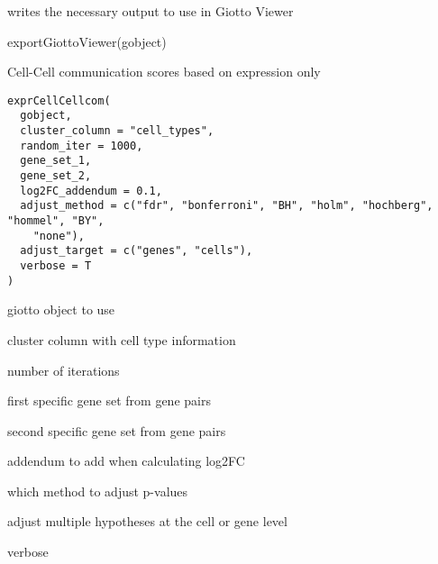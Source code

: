 \documentclass[a4paper]{book}
\begin{document}
%
\begin{Value}
writes the necessary output to use in Giotto Viewer
\end{Value}
%
\begin{Examples}
\begin{ExampleCode}
    exportGiottoViewer(gobject)
\end{ExampleCode}
\end{Examples}
%
\begin{Description}\relax
Cell-Cell communication scores based on expression only
\end{Description}
%
\begin{Usage}
\begin{verbatim}
exprCellCellcom(
  gobject,
  cluster_column = "cell_types",
  random_iter = 1000,
  gene_set_1,
  gene_set_2,
  log2FC_addendum = 0.1,
  adjust_method = c("fdr", "bonferroni", "BH", "holm", "hochberg", "hommel", "BY",
    "none"),
  adjust_target = c("genes", "cells"),
  verbose = T
)
\end{verbatim}
\end{Usage}
%
\begin{Arguments}
\begin{ldescription}
\item[\code{gobject}] giotto object to use

\item[\code{cluster\_column}] cluster column with cell type information

\item[\code{random\_iter}] number of iterations

\item[\code{gene\_set\_1}] first specific gene set from gene pairs

\item[\code{gene\_set\_2}] second specific gene set from gene pairs

\item[\code{log2FC\_addendum}] addendum to add when calculating log2FC

\item[\code{adjust\_method}] which method to adjust p-values

\item[\code{adjust\_target}] adjust multiple hypotheses at the cell or gene level

\item[\code{verbose}] verbose
\end{ldescription}
\end{Arguments}
\end{document}
